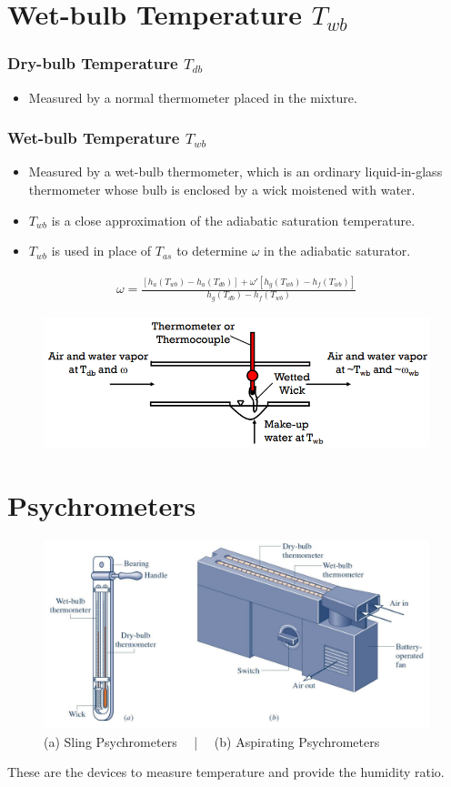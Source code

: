 \documentclass[class=report, crop=false, 12pt,a4paper]{standalone}
\numberwithin{equation}{section}
\begin{document}
\section{Wet-bulb Temperature $T_{wb}$}
\subsubsection{Dry-bulb Temperature $T_{db}$}
\begin{itemize}[noitemsep]
  \item Measured by a normal thermometer placed in the mixture.
\end{itemize}
\subsubsection{Wet-bulb Temperature $T_{wb}$}
\begin{itemize}[noitemsep]
  \item Measured by a wet-bulb thermometer, which is an ordinary liquid-in-glass thermometer whose bulb is enclosed by a wick moistened with water.
  \item $T_{wb}$ is a close approximation of the adiabatic saturation temperature.
  \item $T_{wb}$ is used in place of $T_{as}$ to determine $\omega$ in the adiabatic saturator.
\end{itemize}
\begin{gather}
  \omega = \frac{[h_a(T_{wb}) - h_a(T_{db})] + \omega'[h_g(T_{wb}) - h_f(T_{wb})]}{h_g(T_{db}) - h_f(T_{wb})}
\end{gather}
\begin{figure}[H]
  \centering
  \includegraphics[width = 0.95 \textwidth]{../img/diagram103.png}
  \caption{}
\end{figure}
\section{Psychrometers}
\begin{figure}[H]
  \centering
  \includegraphics[width = 0.9 \textwidth]{../img/diagram104.png}
  \caption{(a) Sling Psychrometers \ \ | \ \ (b) Aspirating Psychrometers}
\end{figure}
These are the devices to measure temperature and provide the humidity ratio.
\end{document}
